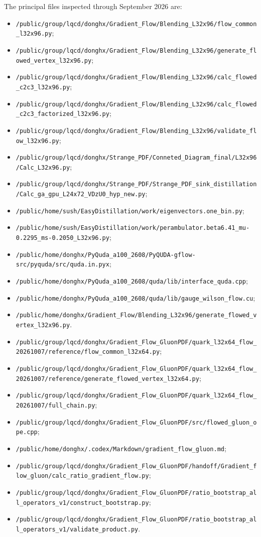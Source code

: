 \documentclass[11pt]{article}
\numberwithin{equation}{section}
\begin{document}
The principal files inspected through September 2026 are:
\begin{itemize}
  \raggedright
  \item \nolinkurl{/public/group/lqcd/donghx/Gradient_Flow/Blending_L32x96/flow_common_l32x96.py};
  \item \nolinkurl{/public/group/lqcd/donghx/Gradient_Flow/Blending_L32x96/generate_flowed_vertex_l32x96.py};
  \item \nolinkurl{/public/group/lqcd/donghx/Gradient_Flow/Blending_L32x96/calc_flowed_c2c3_l32x96.py};
  \item \nolinkurl{/public/group/lqcd/donghx/Gradient_Flow/Blending_L32x96/calc_flowed_c2c3_factorized_l32x96.py};
  \item \nolinkurl{/public/group/lqcd/donghx/Gradient_Flow/Blending_L32x96/validate_flow_l32x96.py};
  \item \nolinkurl{/public/group/lqcd/donghx/Strange_PDF/Conneted_Diagram_final/L32x96/Calc_L32x96.py};
  \item \nolinkurl{/public/group/lqcd/donghx/Strange_PDF/Strange_PDF_sink_distillation/Calc_ga_gpu_L24x72_VDzU0_hyp_new.py};
  \item \nolinkurl{/public/home/sush/EasyDistillation/work/eigenvectors.one_bin.py};
  \item \nolinkurl{/public/home/sush/EasyDistillation/work/perambulator.beta6.41_mu-0.2295_ms-0.2050_L32x96.py};
  \item \nolinkurl{/public/home/donghx/PyQuda_a100_2608/PyQUDA-gflow-src/pyquda/src/quda.in.pyx};
  \item \nolinkurl{/public/home/donghx/PyQuda_a100_2608/quda/lib/interface_quda.cpp};
  \item \nolinkurl{/public/home/donghx/PyQuda_a100_2608/quda/lib/gauge_wilson_flow.cu};
  \item \nolinkurl{/public/home/donghx/Gradient_Flow/Blending_L32x96/generate_flowed_vertex_l32x96.py}.
  \item \nolinkurl{/public/group/lqcd/donghx/Gradient_Flow_GluonPDF/quark_l32x64_flow_20261007/reference/flow_common_l32x64.py};
  \item \nolinkurl{/public/group/lqcd/donghx/Gradient_Flow_GluonPDF/quark_l32x64_flow_20261007/reference/generate_flowed_vertex_l32x64.py};
  \item \nolinkurl{/public/group/lqcd/donghx/Gradient_Flow_GluonPDF/quark_l32x64_flow_20261007/full_chain.py};
  \item \nolinkurl{/public/group/lqcd/donghx/Gradient_Flow_GluonPDF/src/flowed_gluon_ope.cpp};
  \item \nolinkurl{/public/home/donghx/.codex/Markdown/gradient_flow_gluon.md};
  \item \nolinkurl{/public/group/lqcd/donghx/Gradient_Flow_GluonPDF/handoff/Gradient_flow_gluon/calc_ratio_gradient_flow.py};
  \item \nolinkurl{/public/group/lqcd/donghx/Gradient_Flow_GluonPDF/ratio_bootstrap_all_operators_v1/construct_bootstrap.py};
  \item \nolinkurl{/public/group/lqcd/donghx/Gradient_Flow_GluonPDF/ratio_bootstrap_all_operators_v1/validate_product.py}.
\end{itemize}
\end{document}
